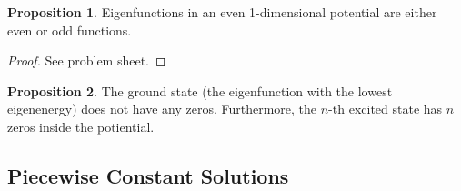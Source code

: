 \documentclass[]{article}
\theoremstyle{definition}
\theoremstyle{definition}
\newtheorem{proposition}{Proposition}[section]
\begin{document}
\begin{proposition}
  Eigenfunctions in an even 1-dimensional potential are either even or 
  odd functions.
\end{proposition}
\begin{proof}
  See problem sheet.
\end{proof}

\begin{proposition}
  The ground state (the eigenfunction with the lowest eigenenergy) does not 
  have any zeros. Furthermore, the \(n\)-th excited state has \(n\) zeros inside 
  the potiential.
\end{proposition}

\subsection{Piecewise Constant Solutions}
\end{document}
